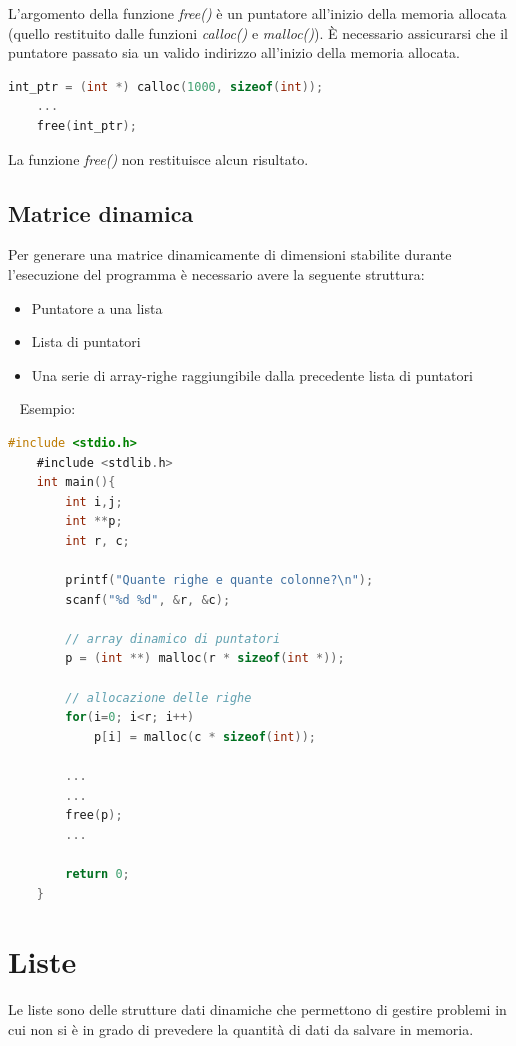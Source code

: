 \documentclass[a4paper,11pt,oneside]{book}
\begin{document}
L'argomento della funzione \emph{free()} è un puntatore all'inizio della memoria allocata (quello restituito dalle funzioni \emph{calloc()} e \emph{malloc()}).
È necessario assicurarsi che il puntatore passato sia un valido indirizzo all'inizio della memoria allocata.

\begin{lstlisting}[language=C]
    int_ptr = (int *) calloc(1000, sizeof(int));
    ... 
    free(int_ptr);
\end{lstlisting}
La funzione \emph{free()} non restituisce alcun risultato.

\section{Matrice dinamica}
Per generare una matrice dinamicamente di dimensioni stabilite durante l'esecuzione del programma è necessario avere la seguente struttura:
\begin{itemize}
    \item Puntatore a una lista
    \item Lista di puntatori
    \item Una serie di array-righe raggiungibile dalla precedente lista di puntatori
\end{itemize}

~\newline
Esempio:
\begin{lstlisting}[language=C]
    #include <stdio.h>
    #include <stdlib.h>
    int main(){
        int i,j;
        int **p;
        int r, c;

        printf("Quante righe e quante colonne?\n");
        scanf("%d %d", &r, &c);

        // array dinamico di puntatori
        p = (int **) malloc(r * sizeof(int *)); 

        // allocazione delle righe
        for(i=0; i<r; i++)
            p[i] = malloc(c * sizeof(int));
        
        ... 
        ... 
        free(p);
        ... 

        return 0;
    }
\end{lstlisting}

\chapter{Liste}
Le liste sono delle strutture dati dinamiche che permettono di gestire problemi in cui non si è in grado di prevedere la quantità
di dati da salvare in memoria.
\end{document}
